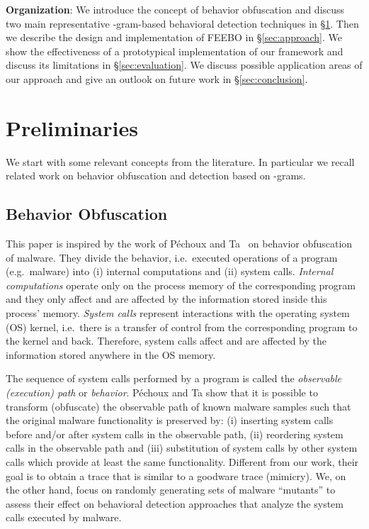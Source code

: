 \documentclass{llncs}
\begin{document}
\textbf{Organization}: We introduce the concept of behavior obfuscation and discuss two main representative -gram-based behavioral detection techniques in \S\ref{sec:preliminaries}. Then we describe the design and implementation of FEEBO in \S\ref{sec:approach}. We show the effectiveness of a prototypical implementation of our framework and discuss its limitations in \S\ref{sec:evaluation}. We discuss possible application areas of our approach and give an outlook on future work in \S\ref{sec:conclusion}.


 
\section{Preliminaries}
\label{sec:preliminaries}

We start with some relevant concepts from the literature. In particular we recall related work
on behavior obfuscation and detection based on -grams.

\subsection{Behavior Obfuscation}

This paper is inspired by the work of P\'{e}choux and Ta~\cite{pechoux2014} on behavior obfuscation of malware. They divide the behavior, i.e.~executed operations of a program (e.g.~malware) into (i) internal computations and (ii) system calls. \emph{Internal computations} operate only on the process memory of the corresponding program and they only affect and are affected by the information stored inside this process' memory. \emph{System calls} represent interactions with the operating system (OS) kernel, i.e.~there is a transfer of control from the corresponding program to the kernel and back. Therefore, system calls affect and are affected by the information stored anywhere in the OS memory. 

The sequence of system calls performed by a program is called the \emph{observable (execution) path} or \emph{behavior}. P\'{e}choux and Ta show that it is possible to transform (obfuscate) the observable path of known malware samples such that the original malware functionality is preserved by: (i) inserting system calls before and/or after system calls in the observable path, (ii) reordering system calls in the observable path and (iii) substitution of system calls by other system calls which provide at least the same functionality. Different from our work, their goal is to obtain a trace that is similar to a goodware trace (mimicry). We, on the other hand, focus on randomly generating sets of malware ``mutants'' to assess their effect on behavioral detection approaches that analyze the system calls executed by malware.
\end{document}
